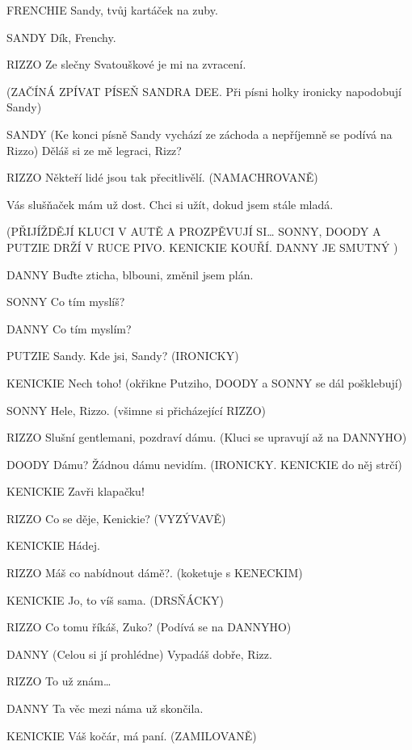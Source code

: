 FRENCHIE        Sandy, tvůj kartáček na zuby.

SANDY        Dík, Frenchy. 

RIZZO        Ze slečny Svatouškové je mi na zvracení.

        (ZAČÍNÁ ZPÍVAT PÍSEŇ SANDRA DEE. Při písni holky ironicky                 napodobují Sandy)

SANDY        (Ke konci písně Sandy vychází ze záchoda a nepříjemně se podívá na         Rizzo)  Děláš si ze mě legraci, Rizz?

RIZZO        Někteří lidé jsou tak přecitlivělí. (NAMACHROVANĚ) 

        Vás slušňaček mám už dost. Chci si užít, dokud jsem stále mladá.





(PŘIJÍŽDĚJÍ KLUCI V AUTĚ A PROZPĚVUJÍ SI… SONNY, DOODY A PUTZIE         DRŽÍ V RUCE PIVO. KENICKIE KOUŘÍ. DANNY JE SMUTNÝ )

DANNY        Buďte zticha, blbouni, změnil jsem plán.

SONNY        Co tím myslíš?

DANNY        Co tím myslím? 

PUTZIE        Sandy. Kde jsi, Sandy? (IRONICKY)

KENICKIE        Nech toho! (okřikne Putziho, DOODY a SONNY se dál pošklebují)

SONNY        Hele, Rizzo. (všimne si přicházející RIZZO)

RIZZO        Slušní gentlemani,  pozdraví dámu. (Kluci se upravují až na DANNYHO)

DOODY        Dámu? Žádnou dámu nevidím. (IRONICKY. KENICKIE do něj strčí) 

KENICKIE        Zavři klapačku!

RIZZO        Co se děje, Kenickie? (VYZÝVAVĚ) 

KENICKIE        Hádej.

RIZZO        Máš co nabídnout dámě?. (koketuje s KENECKIM) 

KENICKIE        Jo, to víš sama. (DRSŇÁCKY) 

RIZZO        Co tomu říkáš, Zuko? (Podívá se na DANNYHO)

DANNY        (Celou si jí prohlédne) Vypadáš dobře, Rizz.

RIZZO         To už znám…

DANNY        Ta věc mezi náma už skončila.  

KENICKIE        Váš kočár, má paní. (ZAMILOVANĚ) 

